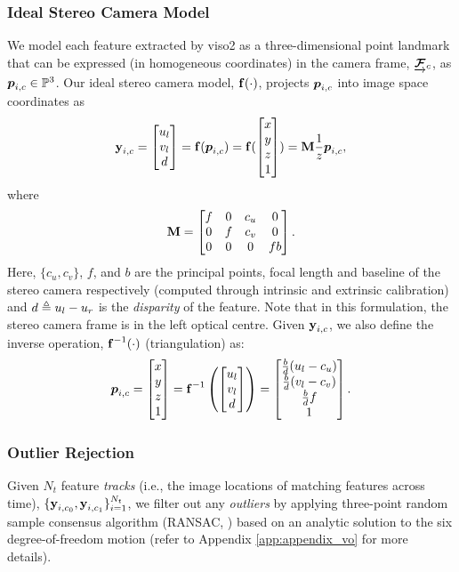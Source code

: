 \subsubsection{Ideal Stereo Camera Model}
We model each feature extracted by \textsf{viso2} as a three-dimensional point landmark that can be expressed (in homogeneous coordinates) in the camera frame, $\underrightarrow{ \boldsymbol{\mathbf{\mathcal{F}}} }_{c}$, as
$\HomogeneousPoint{i}{c} \in
\HomogeneousNumbers[3]$.  Our ideal stereo camera model, $\boldsymbol{\mathbf{f}}(\cdot)$,
projects $\boldsymbol{p}_{i,c}$ into image space coordinates as
 \begin{equation}
	\boldsymbol{\mathbf{y}}_{i, c} = \begin{bmatrix} u_l \\ v_l \\ d  \end{bmatrix}  
  =\boldsymbol{\mathbf{f}}(\boldsymbol{p}_{i,c}) =  \boldsymbol{\mathbf{f}}(\begin{bmatrix} x \\ y \\ z \\ 1 \end{bmatrix}) = 
   \boldsymbol{\mathbf{M}} \frac{1}{z} \boldsymbol{p}_{i,c},
\end{equation}
where
\begin{equation}
\boldsymbol{\mathbf{M}} = \begin{bmatrix} f & 0 & c_u & 0 \\ 0 & f & c_v & 0 \\ 0 & 0 & 0 & fb \end{bmatrix}.
\end{equation}
Here, $\{c_u, c_v\}$, $f$, and $b$ are the principal points, focal
length and baseline of the stereo camera respectively (computed through intrinsic and extrinsic calibration) and $d \triangleq u_l - u_r$ is the \textit{disparity} of the feature. Note that in this
formulation, the stereo camera frame is in the left optical centre. Given $\boldsymbol{\mathbf{y}}_{i, c}$, we also define the inverse operation, $\boldsymbol{\mathbf{f}}^{-1}(\cdot)$ (triangulation) as:
 \begin{equation}
	\boldsymbol{p}_{i,c} = \begin{bmatrix} x \\ y \\ z \\ 1 \end{bmatrix} =  \boldsymbol{\mathbf{f}}^{-1}\left( \begin{bmatrix} u_l \\ v_l \\ d \end{bmatrix} \right) =  \begin{bmatrix}  \frac{b}{d}(u_l - c_u) \\ \frac{b}{d}(v_l - c_v) \\ \frac{b}{d} f \\ 1 \end{bmatrix}.
\end{equation}



\subsubsection{Outlier Rejection}
Given $N_t$ feature \textit{tracks} (i.e., the image locations of matching features across time), $\{\boldsymbol{\mathbf{y}}_{i, c_0}, \boldsymbol{\mathbf{y}}_{i, c_1}\}_{i=1}^{N_t}$, we filter out any \textit{outliers} by applying three-point random sample consensus algorithm (RANSAC, \cite{fischler1981random}) based on an analytic solution to the six degree-of-freedom motion \citep{Umeyama1991-ws} (refer to Appendix \ref{app:appendix_vo} for more details).
  
